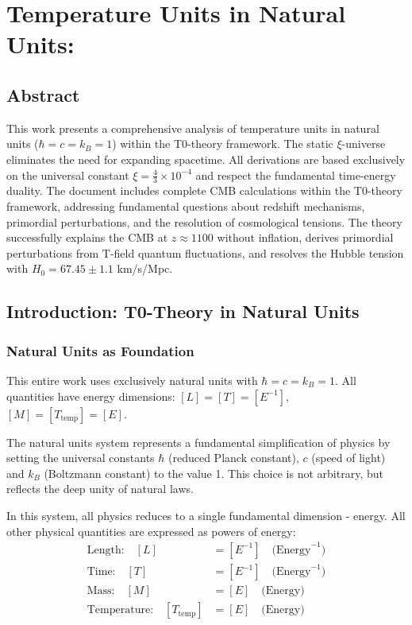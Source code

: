 \chapter{Temperature Units in Natural Units: \\}

\section*{Abstract}
		This work presents a comprehensive analysis of temperature units in natural units ($\hbar = c = k_B = 1$) within the T0-theory framework. The static $\xi$-universe eliminates the need for expanding spacetime. All derivations are based exclusively on the universal constant $\xi = \frac{4}{3} \times 10^{-4}$ and respect the fundamental time-energy duality. The document includes complete CMB calculations within the T0-theory framework, addressing fundamental questions about redshift mechanisms, primordial perturbations, and the resolution of cosmological tensions. The theory successfully explains the CMB at $z \approx 1100$ without inflation, derives primordial perturbations from T-field quantum fluctuations, and resolves the Hubble tension with $H_0 = 67.45 \pm 1.1$ km/s/Mpc.

	

	\section{Introduction: T0-Theory in Natural Units}
	
	\subsection{Natural Units as Foundation}
	
	\begin{important}
		This entire work uses exclusively natural units with $\hbar = c = k_B = 1$. All quantities have energy dimensions: $[L] = [T] = [E^{-1}]$, $[M] = [T_{\text{temp}}] = [E]$.
	\end{important}
	
	The natural units system represents a fundamental simplification of physics by setting the universal constants $\hbar$ (reduced Planck constant), $c$ (speed of light) and $k_B$ (Boltzmann constant) to the value 1. This choice is not arbitrary, but reflects the deep unity of natural laws.
	
	In this system, all physics reduces to a single fundamental dimension - energy. All other physical quantities are expressed as powers of energy:
	\begin{align}
		\text{Length:} \quad [L] &= [E^{-1}] \quad \text{(Energy}^{-1}\text{)} \\
		\text{Time:} \quad [T] &= [E^{-1}] \quad \text{(Energy}^{-1}\text{)} \\
		\text{Mass:} \quad [M] &= [E] \quad \text{(Energy)} \\
		\text{Temperature:} \quad [T_{\text{temp}}] &= [E] \quad \text{(Energy)}
	\end{align}
	
